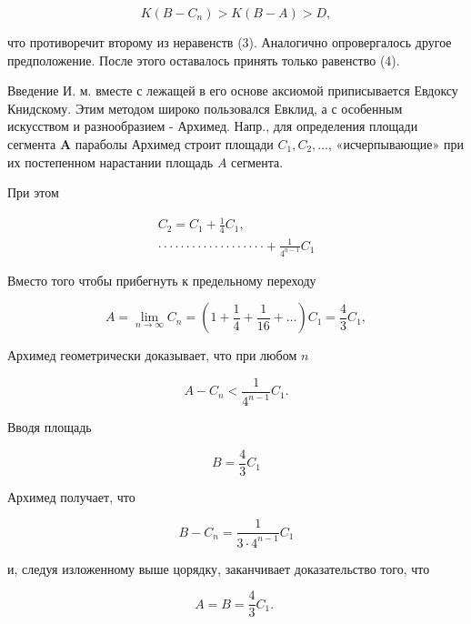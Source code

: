 \documentclass[10pt]{article}
\begin{document}
\[

K\left(B-C_{n}\right)>K(B-A)>D,

\]



что противоречит второму из неравенств (3). Аналогично опровергалось другое предположение. После этого оставалось принять только равенство (4).



Введение И. м. вместе с лежащей в его основе аксиомой приписывается Евдоксу Книдскому. Этим методом широко пользовался Евклид, а с особенным искусством и разнообразием - Архимед. Напр., для определения площади сегмента $\boldsymbol{A}$ параболы Архимед строит площади $C_{1}, C_{2}, \ldots$, «исчерпывающие» при их постепенном нарастании площадь $A$ сегмента.



При этом



\[

\begin{gathered}

C_{2}=C_{1}+\frac{1}{4} C_{1}, \\

\cdot \cdot \cdot \cdot \cdot \cdot \cdot \cdot \cdot \cdot \cdot \cdot \cdot \cdot \cdot \cdot \cdot \cdot \cdot+\frac{1}{4^{n-1}} C_{1}

\end{gathered}

\]



Вместо того чтобы прибегнуть к предельному переходу



\[

A=\lim _{n \rightarrow \infty} C_{n}=\left(1+\frac{1}{4}+\frac{1}{16}+\ldots\right) C_{1}=\frac{4}{3} C_{1},

\]



Архимед геометрически доказывает, что при любом $n$



\[

A-C_{n}<\frac{1}{4^{n-1}} C_{1} .

\]



Вводя площадь



\[

B=\frac{4}{3} C_{1}

\]



Архимед получает, что



\[

B-C_{n}=\frac{1}{3 \cdot 4^{n-1}} C_{1}

\]



и, следуя изложенному выше цорядку, заканчивает доказательство того, что



\[

A=B=\frac{4}{3} C_{1} \text {. }

\]
\end{document}
